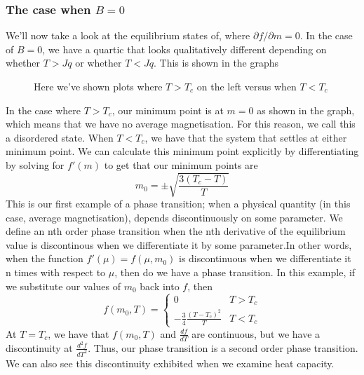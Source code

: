 \subsubsection*{The case when $ B = 0 $}
We'll now take a look at the equilibrium states of, where $ \partial f / \partial m  =0 $. In the case of $B = 0 $, we have a quartic that looks qualitatively different depending on whether $ T > Jq $ or whether $T < Jq $. This is shown in the graphs 
\begin{figure}
	\centering 
	\quad 

	\caption{ Here we've shown plots where $T > T_c$ on the left versus when $T< T_c$} 
\end{figure} 
In the case where $T > T_c $, our minimum point is at $m = 0$ as shown in the graph, which means that we have no average magnetisation. For this reason, we call this a disordered state. 
When $T < T_c$, we have that the system that settles at either minimum point. We can calculate this minimum point explicitly by differentiating by solving for $f'(m ) $ to get that our minimum points are 
\[ 
m_0 = \pm \sqrt{ \frac{ 3 ( T_c - T ) }{ T } } 
\] 
This is our first example of a phase transition; when a physical quantity (in this case, average magnetisation), depends discontinuously on some parameter. We define an nth order phase transition when the nth derivative of the equilibrium value is discontinous when we differentiate it by some parameter.In other words, when the function $f'(\mu) = f( \mu, m_0 )$ is discontinuous when we differentiate it n times with respect to $\mu$, then do we have a phase transition. In this example, if we substitute our values of $m_0$ back into $f$, then 
\[ 
f(m_0, T) = \begin{cases} 
		0 & T > T_c \\ 
		 - \frac{3}{ 4} \frac{ ( T - T_c)^2 }{ T }  & T< T_c 			\end{cases} 
\] 
At $ T = T_c$, we have that $f( m_0, T )$ and $\frac{ df }{ dT } $ are continuous, but we have a discontinuity at $\frac{ d^2 f}{ dT^2 } $. 
Thus, our phase transition is a second order phase transition. 
We can also see this discontinuity exhibited when we examine heat capacity. 


